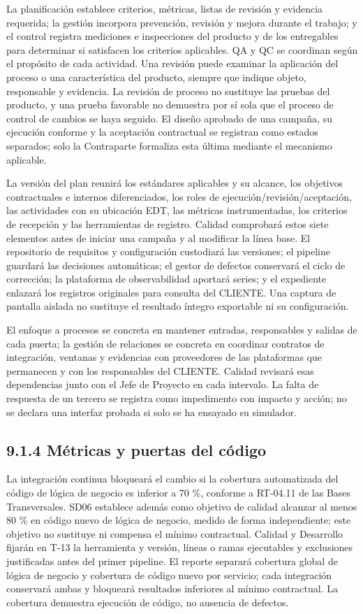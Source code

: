 \documentclass[11pt]{article}
\begin{document}
La planificación establece criterios, métricas, listas de revisión y evidencia requerida; la gestión incorpora prevención, revisión y mejora durante el trabajo; y el control registra mediciones e inspecciones del producto y de los entregables para determinar si satisfacen los criterios aplicables. QA y QC se coordinan según el propósito de cada actividad. Una revisión puede examinar la aplicación del proceso o una característica del producto, siempre que indique objeto, responsable y evidencia. La revisión de proceso no sustituye las pruebas del producto, y una prueba favorable no demuestra por sí sola que el proceso de control de cambios se haya seguido. El diseño aprobado de una campaña, su ejecución conforme y la aceptación contractual se registran como estados separados; solo la Contraparte formaliza esta última mediante el mecanismo aplicable.

La versión del plan reunirá los estándares aplicables y su alcance, los objetivos contractuales e internos diferenciados, los roles de ejecución/revisión/aceptación, las actividades con su ubicación EDT, las métricas instrumentadas, los criterios de recepción y las herramientas de registro. Calidad comprobará estos siete elementos antes de iniciar una campaña y al modificar la línea base. El repositorio de requisitos y configuración custodiará las versiones; el pipeline guardará las decisiones automáticas; el gestor de defectos conservará el ciclo de corrección; la plataforma de observabilidad aportará series; y el expediente enlazará los registros originales para consulta del CLIENTE. Una captura de pantalla aislada no sustituye el resultado íntegro exportable ni su configuración.

El enfoque a procesos se concreta en mantener entradas, responsables y salidas de cada puerta; la gestión de relaciones se concreta en coordinar contratos de integración, ventanas y evidencias con proveedores de las plataformas que permanecen y con los responsables del CLIENTE. Calidad revisará esas dependencias junto con el Jefe de Proyecto en cada intervalo. La falta de respuesta de un tercero se registra como impedimento con impacto y acción; no se declara una interfaz probada si solo se ha ensayado su simulador.

\subsection{9.1.4 Métricas y puertas del código}

La integración continua bloqueará el cambio si la cobertura automatizada del código de lógica de negocio es inferior a 70 \%, conforme a RT-04.11 de las Bases Transversales. SD06 establece además como objetivo de calidad alcanzar al menos 80 \% en código nuevo de lógica de negocio, medido de forma independiente; este objetivo no sustituye ni compensa el mínimo contractual. Calidad y Desarrollo fijarán en T-13 la herramienta y versión, líneas o ramas ejecutables y exclusiones justificadas antes del primer pipeline. El reporte separará cobertura global de lógica de negocio y cobertura de código nuevo por servicio; cada integración conservará ambas y bloqueará resultados inferiores al mínimo contractual. La cobertura demuestra ejecución de código, no ausencia de defectos.
\end{document}
